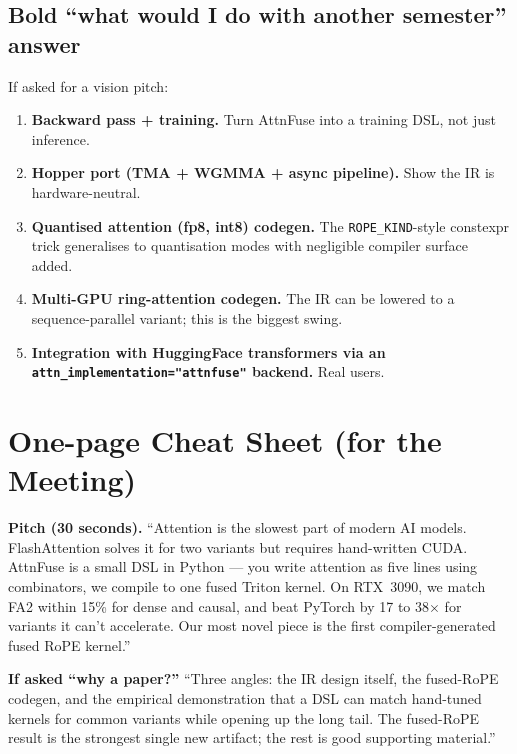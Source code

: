 \documentclass[11pt]{article}
\begin{document}
\subsection{Bold ``what would I do with another semester'' answer}

If asked for a vision pitch:
\begin{enumerate}[leftmargin=1.4em,itemsep=2pt]
  \item \textbf{Backward pass + training.} Turn AttnFuse into a training
        DSL, not just inference.
  \item \textbf{Hopper port (TMA + WGMMA + async pipeline).} Show the IR
        is hardware-neutral.
  \item \textbf{Quantised attention (fp8, int8) codegen.} The
        \texttt{ROPE\_KIND}-style constexpr trick generalises to
        quantisation modes with negligible compiler surface added.
  \item \textbf{Multi-GPU ring-attention codegen.} The IR can be lowered
        to a sequence-parallel variant; this is the biggest swing.
  \item \textbf{Integration with HuggingFace transformers via an
        \texttt{attn\_implementation="attnfuse"} backend.} Real users.
\end{enumerate}

\section{One-page Cheat Sheet (for the Meeting)}

\textbf{Pitch (30 seconds).}
``Attention is the slowest part of modern AI models. FlashAttention solves
it for two variants but requires hand-written CUDA. AttnFuse is a small DSL
in Python --- you write attention as five lines using combinators, we
compile to one fused Triton kernel. On RTX~3090, we match FA2 within 15\%
for dense and causal, and beat PyTorch by 17 to 38$\times$ for variants it
can't accelerate. Our most novel piece is the first compiler-generated
fused RoPE kernel.''

\textbf{If asked ``why a paper?''}
``Three angles: the IR design itself, the fused-RoPE codegen, and the
empirical demonstration that a DSL can match hand-tuned kernels for
common variants while opening up the long tail. The fused-RoPE result is
the strongest single new artifact; the rest is good supporting material.''
\end{document}

